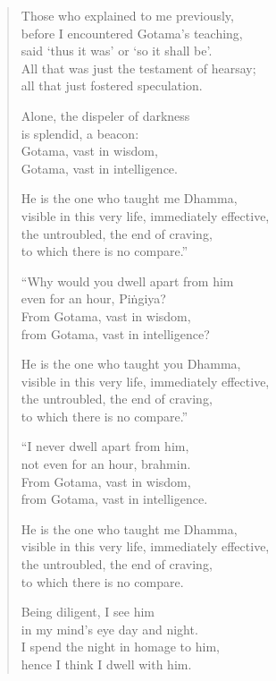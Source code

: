 \documentclass[12pt,openany]{book}%
\begin{document}
\begin{verse}
Those who explained to me previously, \\
before I encountered Gotama’s teaching, \\
said ‘thus it was’ or ‘so it shall be’. \\
All that was just the testament of hearsay; \\
all that just fostered speculation. 

Alone, the dispeler of darkness \\
is splendid, a beacon: \\
Gotama, vast in wisdom, \\
Gotama, vast in intelligence. 

He is the one who taught me Dhamma, \\
visible in this very life, immediately effective, \\
the untroubled, the end of craving, \\
to which there is no compare.” 

“Why would you dwell apart from him \\
even for an hour, \textsanskrit{Piṅgiya}? \\
From Gotama, vast in wisdom, \\
from Gotama, vast in intelligence? 

He is the one who taught you Dhamma, \\
visible in this very life, immediately effective, \\
the untroubled, the end of craving, \\
to which there is no compare.” 

“I never dwell apart from him, \\
not even for an hour, brahmin. \\
From Gotama, vast in wisdom, \\
from Gotama, vast in intelligence. 

He is the one who taught me Dhamma, \\
visible in this very life, immediately effective, \\
the untroubled, the end of craving, \\
to which there is no compare. 

Being diligent, I see him \\
in my mind’s eye day and night. \\
I spend the night in homage to him, \\
hence I think I dwell with him. 


\end{verse}
\end{document}

